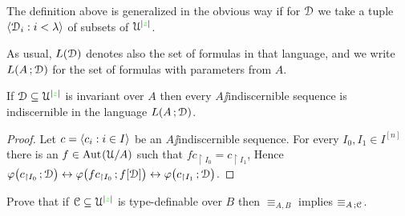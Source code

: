 \documentclass[creche.tex]{subfiles}
\begin{document}
The definition above is generalized in the obvious way if for $\EuScript D$ we take a tuple $\langle\EuScript D_i:i<\lambda\rangle$ of subsets of $\EuScript U^{|{\color{green} z}|}$.

As usual, $L(\EuScript D)$ denotes also the set of formulas in that language, and we write  $L(A\,;\EuScript D)$ for the set of formulas with parameters from $A$.


\begin{proposition}\label{prop_indiscernible_L(A,D)}
If $\EuScript D\subseteq\EuScript U^{|{\color{green} z}|}$ is invariant over $A$ then every $A\jj$indiscernible sequence is indiscernible in the language $L(A\,;\EuScript D)$.
\end{proposition}

\begin{proof}
Let $c=\langle c_i:i\in I\rangle$ be an $A\jj$indiscernible sequence. For every $I_0,I_1\in I^{[n]}$ there is an $f\in\textrm{Aut\kern.15ex}(\EuScript U/A)$ such that $fc_{\restriction I_0}=c_{\restriction I_1}$, Hence $\varphi\big(c_{\restriction I_0}\,;\EuScript D\big)\leftrightarrow \varphi\big(fc_{\restriction I_0}\,;f[\EuScript D]\big)\leftrightarrow\varphi\big(c_{\restriction I_1}\,;\EuScript D\big)$.
\end{proof}



\begin{exercise}
Prove that if $\EuScript C\subseteq\EuScript U^{|{\color{green} z}|}$ is type-definable over $B$ then $\equiv_{A,B}$ implies $\equiv_{A\,;\EuScript C}$.\QED
\end{exercise} 
\end{document}
